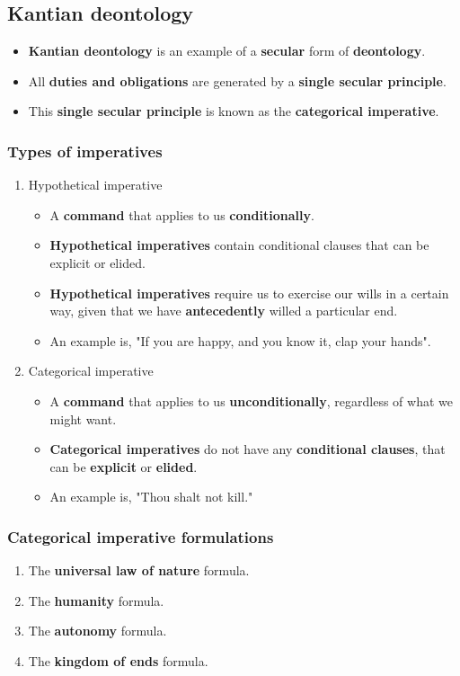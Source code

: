 \documentclass[11pt]{article}
\begin{document}
\subsection{Kantian deontology}
\label{sec:org4bc59b7}
\begin{itemize}
\item \textbf{Kantian deontology} is an example of a \textbf{secular} form of \textbf{deontology}.
\item All \textbf{duties and obligations} are generated by a \textbf{single secular principle}.
\item This \textbf{single secular principle} is known as the \textbf{categorical imperative}.
\end{itemize}

 \newpage
\subsubsection{Types of imperatives}
\label{sec:orgc4a80b0}
\begin{enumerate}
\item Hypothetical imperative
\begin{itemize}
\item A \textbf{command} that applies to us \textbf{conditionally}.
\item \textbf{Hypothetical imperatives} contain conditional clauses that can be explicit or elided.
\item \textbf{Hypothetical imperatives} require us to exercise our wills in a certain way, given that we have \textbf{antecedently} willed a particular end.
\item An example is, "If you are happy, and you know it, clap your hands".
\end{itemize}
\item Categorical imperative
\begin{itemize}
\item A \textbf{command} that applies to us \textbf{unconditionally}, regardless of what we might want.
\item \textbf{Categorical imperatives} do not have any \textbf{conditional clauses}, that can be \textbf{explicit} or \textbf{elided}.
\item An example is, "Thou shalt not kill."
\end{itemize}
\end{enumerate}
\subsubsection{Categorical imperative formulations}
\label{sec:orgf4dd8f7}
\begin{enumerate}
\item The \textbf{universal law of nature} formula.
\item The \textbf{humanity} formula.
\item The \textbf{autonomy} formula.
\item The \textbf{kingdom of ends} formula.
\end{enumerate}
\end{document}

